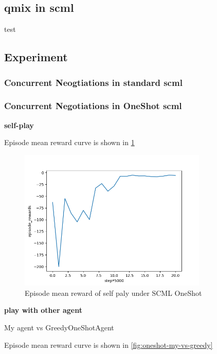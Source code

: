 \subsection{\gls{qmix} in \gls{scml}}
test
\subsection{Experiment}
\subsubsection{Concurrent Neogtiations in standard \gls{scml}}
\subsubsection{Concurrent Negotiations in OneShot \gls{scml}}
\textbf{self-play}

Episode mean reward curve is shown in \ref{fig:oneshot-self-play}

\begin{figure}[htbp]
\centering
\includegraphics[width=0.80\textwidth]{./images/oneshot_self_play.png}
\caption{Episode mean reward of self paly under SCML OneShot}
\label{fig:oneshot-self-play}
\end{figure}

\textbf{play with other agent}

My agent vs GreedyOneShotAgent

Episode mean reward curve is shown in \ref{fig:oneshot-my-vs-greedy}

